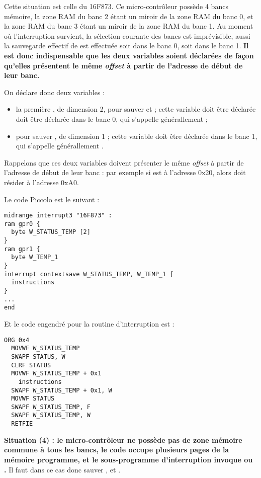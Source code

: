 Cette situation est celle du 16F873. Ce micro-contrôleur possède 4 bancs mémoire, la zone RAM du banc 2 étant un miroir de la zone RAM du banc 0, et la zone RAM du banc 3 étant un miroir de la zone RAM du banc 1. Au moment où l'interruption survient, la sélection courante des bancs est imprévisible, aussi la sauvegarde effectif de  est effectuée soit dans le banc 0, soit dans le banc 1. \textbf{Il est donc indispensable que les deux variables soient déclarées de façon qu'elles présentent le même \emph{offset} à partir de l'adresse de début de leur banc.}

On déclare donc deux variables :
\begin{itemize}
  \item la première , de dimension 2, pour sauver  et  ; cette variable doit être déclarée doit être déclarée dans le banc 0, qui s'appelle générallement  ; 
  \item {} pour sauver , de dimension 1 ; cette variable doit être déclarée dans le banc 1, qui s'appelle générallement .

\end{itemize}

Rappelons que ces deux variables doivent présenter le même \emph{offset} à partir de l'adresse de début de leur banc : par exemple si  est à l'adresse 0x20, alors  doit résider à l'adresse 0xA0.

Le code Piccolo est le suivant :
\begin{lstlisting}[language=piccolo]
midrange interrupt3 "16F873" :
ram gpr0 {
  byte W_STATUS_TEMP [2]
}
ram gpr1 {
  byte W_TEMP_1
}
interrupt contextsave W_STATUS_TEMP, W_TEMP_1 {
  instructions
}
...
end
\end{lstlisting}

Et le code engendré pour la routine d'interruption est :
\begin{lstlisting}[language=assembleur]
  ORG 0x4
  MOVWF W_STATUS_TEMP
  SWAPF STATUS, W
  CLRF STATUS
  MOVWF W_STATUS_TEMP + 0x1
    instructions
  SWAPF W_STATUS_TEMP + 0x1, W
  MOVWF STATUS
  SWAPF W_STATUS_TEMP, F
  SWAPF W_STATUS_TEMP, W
  RETFIE
\end{lstlisting}





\textbf{Situation (4) : le micro-contrôleur ne possède pas de zone mémoire commune à tous les bancs, le code occupe plusieurs pages de la mémoire programme, et le sous-programme d'interruption invoque  ou .} Il faut dans ce cas donc sauver ,  et .


